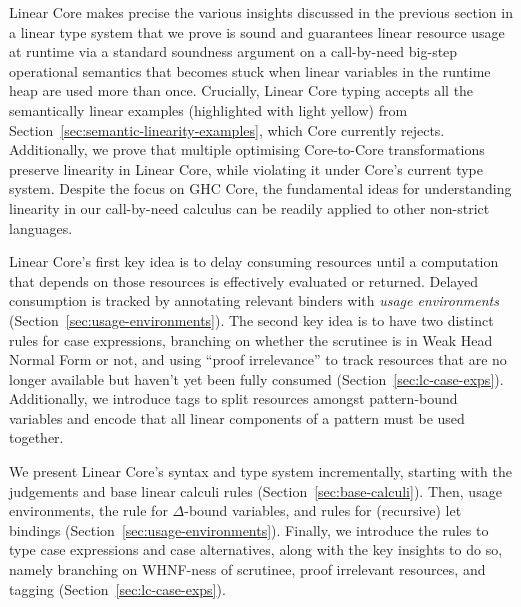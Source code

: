 \documentclass[acmsmall,review,anonymous,screen]{acmart}
\newcommand{\notyetcolorname}{light yellow}
\begin{document}
Linear Core makes precise the various insights discussed in the
previous section in a linear type system that we prove is sound and guarantees
linear resource usage at runtime via a standard soundness argument on a
call-by-need big-step operational semantics that becomes stuck when linear
variables in the runtime heap are used more than once.
Crucially,
Linear Core typing accepts all the semantically linear examples
(highlighted with \colorbox{notyet}{\notyetcolorname})
from Section~\ref{sec:semantic-linearity-examples}, which Core currently
rejects.
%
Additionally, we prove that multiple optimising Core-to-Core transformations
preserve linearity in Linear Core, while violating it under Core's
current type system.
%
% 
Despite the focus on GHC Core, the fundamental ideas for
understanding linearity in our call-by-need calculus can be readily applied to
other non-strict languages.

Linear Core's first key idea is to delay consuming
resources until a computation that depends on those resources is effectively
evaluated or returned. Delayed consumption is tracked by annotating relevant
binders with \emph{usage environments} (Section~\ref{sec:usage-environments}).
%
The second key idea is to have two distinct rules for case
expressions, branching on whether the scrutinee is in Weak Head Normal
Form or not, and using ``proof irrelevance'' to track resources that are no
longer available but haven't yet been fully consumed
(Section~\ref{sec:lc-case-exps}). Additionally, we introduce tags to split
resources amongst pattern-bound variables and %
encode that all linear components of a pattern must be used together.

We present Linear Core's syntax and type system incrementally, starting with the
judgements and base linear calculi rules (Section~\ref{sec:base-calculi}).
%
Then, usage environments, the rule for $\Delta$-bound variables, and rules for
(recursive) let bindings (Section~\ref{sec:usage-environments}).
%
Finally, we introduce the rules to type case expressions and case alternatives,
along with the key insights to do so, namely branching on WHNF-ness of
scrutinee, proof irrelevant resources, and tagging (Section~\ref{sec:lc-case-exps}).

%
\end{document}

